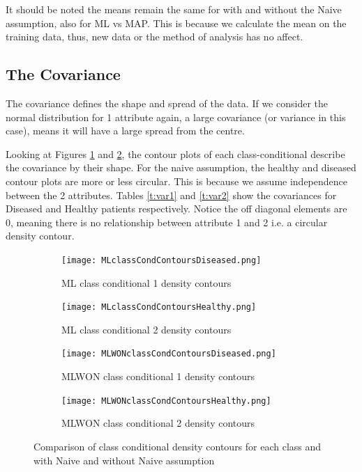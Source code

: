 {It should be noted the means remain the same for with and without the Naive assumption, also for ML vs MAP. This is because we calculate the mean on the training data, thus, new data or the method of analysis has no affect.

\subsection{The Covariance}
The covariance defines the shape and spread of the data. If we consider the normal distribution for 1 attribute again, a large covariance (or variance in this case), means it will have a large spread from the centre. 

Looking at Figures \ref{fig:cml1} and \ref{fig:cml2}, the contour plots of each class-conditional describe the covariance by their shape. For the naive assumption, the healthy and diseased contour plots are more or less circular. This is because we assume independence between the 2 attributes. Tables \ref{t:var1} and \ref{t:var2} show the covariances for Diseased and Healthy patients respectively. Notice the off diagonal elements are 0, meaning there is no relationship between attribute 1 and 2 i.e. a circular density contour. 

\begin{figure}[h!] 
	\centering
	\begin{subfigure}[b]{.40\textwidth}
		\texttt{[image: MLclassCondContoursDiseased.png]}
		\caption{ML class conditional 1 density contours}
		\label{fig:cml1}
	\end{subfigure}
	\begin{subfigure}[b]{.40\textwidth}
		\texttt{[image: MLclassCondContoursHealthy.png]}
		\caption{ML class conditional 2 density contours}
		\label{fig:cml2}
	\end{subfigure}
	\begin{subfigure}[b]{.40\textwidth}
		\texttt{[image: MLWONclassCondContoursDiseased.png]}
		\caption{MLWON class conditional 1 density contours}
		\label{fig:cml3}
	\end{subfigure}
	\begin{subfigure}[b]{.40\textwidth}
		\texttt{[image: MLWONclassCondContoursHealthy.png]}
		\caption{MLWON class conditional 2 density contours}
		\label{fig:cml4}
	\end{subfigure}
	\caption{Comparison of class conditional density contours for each class and with Naive and without Naive assumption}
	\label{fig:CMLdens}
\end{figure}

}
